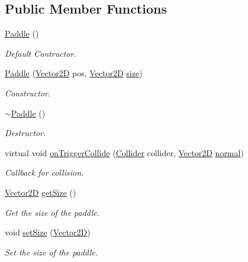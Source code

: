 \subsection*{Public Member Functions}
\begin{DoxyCompactItemize}
\item 
\mbox{\label{class_paddle_a53895671ddfde9ba668546065ec4f164}} 
\mbox{\hyperlink{class_paddle_a53895671ddfde9ba668546065ec4f164}{Paddle}} ()
\begin{DoxyCompactList}\small\item\em Default Contructor. \end{DoxyCompactList}\item 
\mbox{\hyperlink{class_paddle_adbc268e4faceefa60ab2a145757020fb}{Paddle}} (\mbox{\hyperlink{struct_vector2_d}{Vector2D}} pos, \mbox{\hyperlink{struct_vector2_d}{Vector2D}} \mbox{\hyperlink{class_paddle_aa41c1f9a0b8d77d2aba050810cba9b61}{size}})
\begin{DoxyCompactList}\small\item\em Constructor. \end{DoxyCompactList}\item 
\mbox{\label{class_paddle_ac03c6b92f0b9cd2e67edff4c318ad030}} 
\mbox{\hyperlink{class_paddle_ac03c6b92f0b9cd2e67edff4c318ad030}{$\sim$\+Paddle}} ()
\begin{DoxyCompactList}\small\item\em Destructor. \end{DoxyCompactList}\item 
virtual void \mbox{\hyperlink{class_paddle_a90bc62843d04bcd291ab799d323002cf}{on\+Trigger\+Collide}} (\mbox{\hyperlink{class_collider}{Collider}} collider, \mbox{\hyperlink{struct_vector2_d}{Vector2D}} \mbox{\hyperlink{class_collider_a9326e2676880c40f35832ed2c6d6b073}{normal}})
\begin{DoxyCompactList}\small\item\em Callback for collision. \end{DoxyCompactList}\item 
\mbox{\label{class_paddle_a78630fdd23aa5d43d7e8bcbac484404d}} 
\mbox{\hyperlink{struct_vector2_d}{Vector2D}} \mbox{\hyperlink{class_paddle_a78630fdd23aa5d43d7e8bcbac484404d}{get\+Size}} ()
\begin{DoxyCompactList}\small\item\em Get the size of the paddle. \end{DoxyCompactList}\item 
\mbox{\label{class_paddle_a23c28f465a93c6a6ffade220c8f382c0}} 
void \mbox{\hyperlink{class_paddle_a23c28f465a93c6a6ffade220c8f382c0}{set\+Size}} (\mbox{\hyperlink{struct_vector2_d}{Vector2D}})
\begin{DoxyCompactList}\small\item\em Set the size of the paddle. \end{DoxyCompactList}\end{DoxyCompactItemize}
